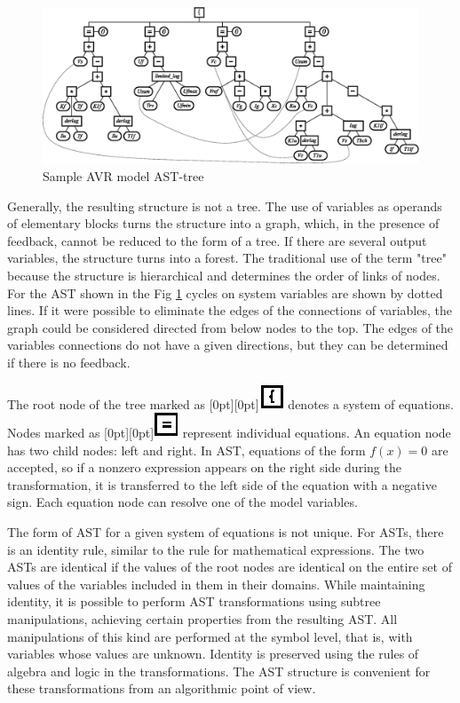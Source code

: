 \documentclass[lettersize,journal]{IEEEtran}
\begin{document}
\begin{figure}[h]
	\centering
	\includegraphics[width=\columnwidth]{ast.eps}
	\caption{Sample AVR model AST-tree }
	\label{fig_ast}
\end{figure}

Generally, the resulting structure is not a tree. The use of variables as operands of elementary blocks turns the structure into a graph,
which, in the presence of feedback, cannot be reduced to the form of a tree. If there are several output variables, the structure
turns into a forest. The traditional use of the term "tree" because the structure is hierarchical and determines
the order of links of nodes. For the AST shown in the Fig \ref{fig_ast} cycles on system variables are shown by dotted lines. 
If it were possible to eliminate the edges of the connections of variables, the graph could be considered directed from below
nodes to the top. The edges of the variables connections do not have a given directions, but they can be determined 
if there is no feedback.

The root node of the tree marked as \raisebox{-2pt}[0pt][0pt]{\includegraphics{eq.eps}} denotes a system of equations. 
Nodes marked as \raisebox{-2pt}[0pt][0pt]{\includegraphics{let.eps}} represent individual equations. An equation node 
has two child nodes: left and right. In AST, equations of the form \(f(x)=0\) are accepted, 
so if a nonzero expression appears on the right side during the transformation, it is transferred to the left 
side of the equation with a negative sign. Each equation node can resolve one of the model variables.

The form of AST for a given system of equations is not unique. For ASTs, there is an identity rule, similar to the rule for
mathematical expressions. The two ASTs are identical if the values of the root nodes are identical on the entire set of values of the
variables included in them in their domains. While maintaining identity, it is possible to perform AST 
transformations using subtree manipulations, achieving certain properties from the resulting AST. All manipulations of 
this kind are performed at the symbol level, that is, with variables whose values are unknown. Identity is preserved 
using the rules of algebra and logic in the transformations. The AST structure is convenient for these 
transformations from an algorithmic point of view.
\end{document}
